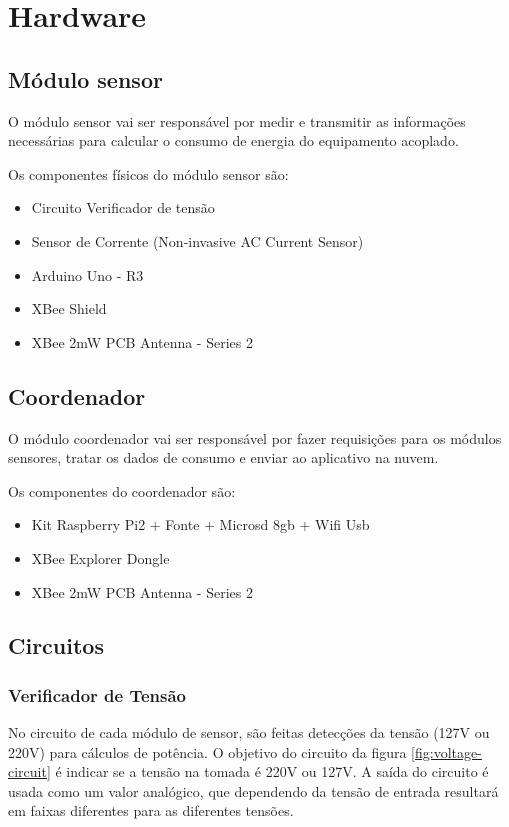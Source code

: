 \section{Hardware}
\label{Sec:hardware}
\subsection{Módulo sensor}

O módulo sensor vai ser responsável por medir e transmitir as informações necessárias para calcular o consumo de energia do equipamento acoplado.

Os componentes físicos do módulo sensor são:

\begin{itemize}
\item Circuito Verificador de tensão
\item Sensor de Corrente (Non-invasive AC Current Sensor)
\item Arduino Uno - R3
\item XBee Shield
\item XBee 2mW PCB Antenna - Series 2
\end{itemize}
%
\subsection{Coordenador}

O módulo coordenador vai ser responsável por fazer requisições para os módulos sensores, tratar os dados de consumo e enviar ao aplicativo na nuvem.

Os componentes do coordenador são:

\begin{itemize}
\item Kit Raspberry Pi2 + Fonte + Microsd 8gb + Wifi Usb
\item XBee Explorer Dongle
\item XBee 2mW PCB Antenna - Series 2
\end{itemize}
%
\subsection{Circuitos}
\subsubsection{Verificador de Tensão}

No circuito de cada módulo de sensor, são feitas detecções da tensão (127V ou 220V) para cálculos de potência.  O objetivo do circuito da figura \ref{fig:voltage-circuit} é indicar se a tensão na tomada é 220V ou 127V. A saída do circuito é usada como um valor analógico, que dependendo da tensão de entrada resultará em faixas diferentes para as diferentes tensões.

